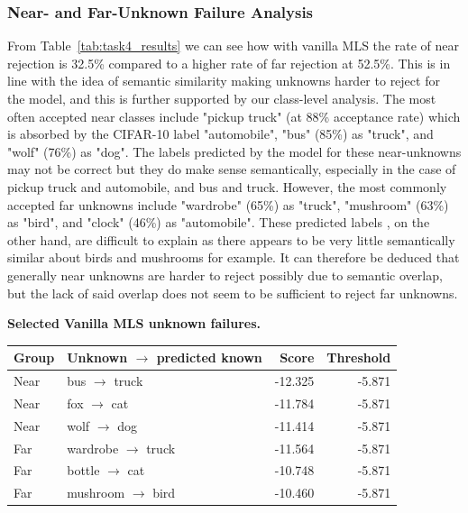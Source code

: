 \documentclass{article}
\begin{document}
\subsubsection{Near- and Far-Unknown Failure Analysis}
\label{subsubsec:results-t4-failures}

From Table~\ref{tab:task4_results} we can see how with vanilla MLS the rate of near rejection is 32.5\% compared to a higher rate of far rejection at 52.5\%. This is in line with the idea of semantic similarity making unknowns harder to reject for the model, and this is further supported by our class-level analysis. The most often accepted near classes include "pickup truck" (at 88\% acceptance rate) which is absorbed by the CIFAR-10 label "automobile", "bus" (85\%) as "truck", and "wolf" (76\%) as "dog". The labels predicted by the model for these near-unknowns may not be correct but they do make sense semantically, especially in the case of pickup truck and automobile, and bus and truck. However, the most commonly accepted far unknowns include "wardrobe" (65\%) as "truck", "mushroom" (63\%) as "bird", and "clock" (46\%) as "automobile". These predicted labels , on the other hand, are difficult to explain as there appears to be very little semantically similar about birds and mushrooms for example. It can therefore be deduced that generally near unknowns are harder to reject possibly due to semantic overlap, but the lack of said overlap does not seem to be sufficient to reject far unknowns.

\begin{table}[t]
    \centering
    \scriptsize
    \setlength{\tabcolsep}{3pt}
    \textbf{Selected Vanilla MLS unknown failures.}\\[0.2em]
    \begin{tabular}{llrr}
        \toprule
        Group & Unknown $\rightarrow$ predicted known & Score & Threshold \\
        \midrule
        Near & bus $\rightarrow$ truck & -12.325 & -5.871 \\
        Near & fox $\rightarrow$ cat & -11.784 & -5.871 \\
        Near & wolf $\rightarrow$ dog & -11.414 & -5.871 \\
        Far & wardrobe $\rightarrow$ truck & -11.564 & -5.871 \\
        Far & bottle $\rightarrow$ cat & -10.748 & -5.871 \\
        Far & mushroom $\rightarrow$ bird & -10.460 & -5.871 \\
        \bottomrule
    \end{tabular}
\end{table}
\end{document}
